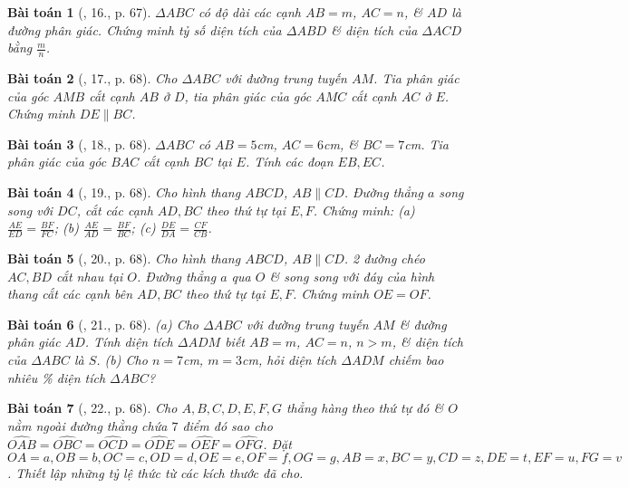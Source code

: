 \documentclass{article}
\newtheorem{baitoan}{Bài toán}
\begin{document}
\begin{baitoan}[\cite{SGK_Toan_8_tap_2}, 16., p. 67]
	$\Delta ABC$ có độ dài các cạnh $AB = m$, $AC = n$, \& $AD$ là đường phân giác. Chứng minh tỷ số diện tích của $\Delta ABD$ \& diện tích của $\Delta ACD$ bằng $\frac{m}{n}$.
\end{baitoan}

\begin{baitoan}[\cite{SGK_Toan_8_tap_2}, 17., p. 68]
	Cho $\Delta ABC$ với đường trung tuyến $AM$. Tia phân giác của góc $AMB$ cắt cạnh $AB$ ở $D$, tia phân giác của góc $AMC$ cắt cạnh $AC$ ở $E$. Chứng minh $DE\parallel BC$.
\end{baitoan}

\begin{baitoan}[\cite{SGK_Toan_8_tap_2}, 18., p. 68]
	$\Delta ABC$ có $AB = 5$\emph{cm}, $AC = 6$\emph{cm}, \& $BC = 7$\emph{cm}. Tia phân giác của góc $BAC$ cắt cạnh $BC$ tại $E$. Tính các đoạn $EB,EC$.
\end{baitoan}

\begin{baitoan}[\cite{SGK_Toan_8_tap_2}, 19., p. 68]
	Cho hình thang $ABCD$, $AB\parallel CD$. Đường thẳng $a$ song song với $DC$, cắt các cạnh $AD,BC$ theo thứ tự tại $E,F$. Chứng minh: (a) $\frac{AE}{ED} = \frac{BF}{FC}$; (b) $\frac{AE}{AD} = \frac{BF}{BC}$; (c) $\frac{DE}{DA} = \frac{CF}{CB}$.
\end{baitoan}

\begin{baitoan}[\cite{SGK_Toan_8_tap_2}, 20., p. 68]
	Cho hình thang $ABCD$, $AB\parallel CD$. 2 đường chéo $AC,BD$ cắt nhau tại $O$. Đường thẳng $a$ qua $O$ \& song song với đáy của hình thang cắt các cạnh bên $AD,BC$ theo thứ tự tại $E,F$. Chứng minh $OE = OF$.	
\end{baitoan}

\begin{baitoan}[\cite{SGK_Toan_8_tap_2}, 21., p. 68]
	(a) Cho $\Delta ABC$ với đường trung tuyến $AM$ \& đường phân giác $AD$. Tính diện tích $\Delta ADM$ biết $AB = m$, $AC = n$, $n > m$, \& diện tích của $\Delta ABC$ là $S$. (b) Cho $n = 7$\emph{cm}, $m = 3$\emph{cm}, hỏi diện tích $\Delta ADM$ chiếm bao nhiêu \% diện tích $\Delta ABC$?
\end{baitoan}

\begin{baitoan}[\cite{SGK_Toan_8_tap_2}, 22., p. 68]
	Cho $A,B,C,D,E,F,G$ thẳng hàng theo thứ tự đó \& $O$ nằm ngoài đường thằng chứa $7$ điểm đó sao cho $\widehat{OAB} = \widehat{OBC} = \widehat{OCD} = \widehat{ODE} = \widehat{OEF} = \widehat{OFG}$. Đặt $OA = a, OB = b, OC = c, OD = d, OE = e, OF = f, OG = g, AB = x, BC = y, CD = z, DE = t, EF = u, FG = v$. Thiết lập những tỷ lệ thức từ các kích thước đã cho.
\end{baitoan}
\end{document}
